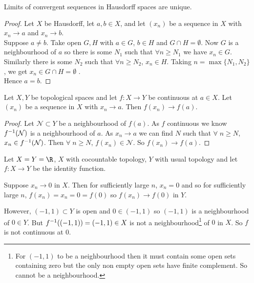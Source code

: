 \begin{proposition} \label{prp:29}
Limits of convergent sequences in Hausdorff spaces are unique.
\end{proposition}

\begin{proof}
Let $X$ be Hausdorff, let $a,b \in X$, and let $(x_n)$ be a sequence in $X$ with $x_n \to a$ and $x_n \to b$. \\
Suppose $a \neq b$. 
Take open $G,H$ with $a \in G$, $b \in H$ and $G \cap H = \emptyset$.
Now $G$ is a neighbourhood of $a$ so there is some $N_1$ such that $\forall n \geq N_1$ we have $x_n \in G$.
Similarly there is some $N_2$ such that $\forall n \geq N_2$, $x_n\in H$. 
Taking $n = \max\{N_1,N_2\}$, we get $x_n\in G\cap H = \emptyset$ \Lightning. \\
Hence $a = b$.
\end{proof}

\begin{proposition} \label{prp:30}
Let $X,Y$ be topological spaces and let $f:X \to Y$ be continuous at $a\in X$. Let $(x_n)$ be a sequence in $X$ with $x_n \to a$. Then $f(x_n) \to f(a)$.
\end{proposition}
\begin{proof}
Let $\mathcal{N} \subset Y$ be a neighbourhood of $f(a)$. 
As $f$ continuous we know $f^{-1} (\mathcal{N})$ is a neighbourhood of $a$. 
As $x_n \to a$ we can find $N$ such that $\forall \; n \geq N$, $x_n\in f^{-1}(\mathcal{N})$. 
Then $\forall \; n \geq N$, $f(x_n) \in \mathcal{N}$. So $f(x_n) \to f(a)$.
\end{proof}

\begin{example}
Let $X=Y=\R$, $X$ with cocountable topology, $Y$ with usual topology and let $f:X \to Y$ be the identity function.

Suppose $x_n \to 0$ in $X$. Then for sufficiently large $n$, $x_n=0$ and so for sufficiently large $n$, $f(x_n) = x_n = 0 = f(0)$ so $f(x_n) \to f(0)$ in $Y$.

However, $(-1,1)\subset Y$ is open and $0\in (-1,1)$ so $(-1,1)$ is a neighbourhood of $0\in Y$. But $f^{-1}((-1,1)) = (-1,1)\in X$ is not a neighbourhood\footnote{For $(-1, 1)$ to be a neighbourhood then it must contain some open sets containing zero but the only non empty open sets have finite complement. So cannot be a neighbourhood.} of $0$ in $X$. So $f$ is not continuous at $0$.
\end{example}

